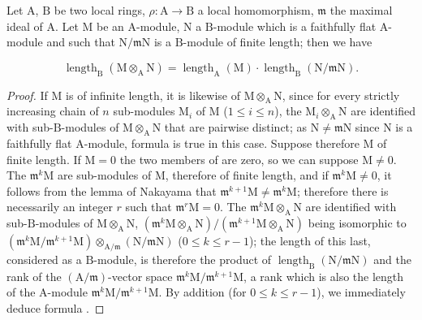 \begin{lemma}[2.5.5.2]
\label{IV.2.5.5.2}
Let $\mathrm{A}$, $\mathrm{B}$ be two local rings, $\rho:\mathrm{A}\to\mathrm{B}$ a local homomorphism,
$\mathfrak{m}$ the maximal ideal of $\mathrm{A}$. Let $\mathrm{M}$ be an $\mathrm{A}$-module, $\mathrm{N}$ a $\mathrm{B}$-module which is a faithfully flat $\mathrm{A}$-module
and such that $\mathrm{N}/\mathfrak{m}\mathrm{N}$ is a $\mathrm{B}$-module of finite length; then we have
\end{lemma}

\begin{env}[2.5.5.3]
\label{IV.2.5.5.3}
\[
  \operatorname{length}_{\mathrm{B}}(\mathrm{M}\otimes_{\mathrm{A}}\mathrm{N}) = \operatorname{length}_{\mathrm{A}}(\mathrm{M})\cdot\operatorname{length}_{\mathrm{B}}(\mathrm{N}/\mathfrak{m}\mathrm{N}).
\]
\end{env}

\begin{proof}
If $\mathrm{M}$ is of infinite length, it is likewise of $\mathrm{M}\otimes_{\mathrm{A}}\mathrm{N}$, since for every strictly
increasing chain of $n$ sub-modules $\mathrm{M}_i$ of $\mathrm{M}$ ($1\leq i\leq n$), the $\mathrm{M}_i\otimes_{\mathrm{A}}\mathrm{N}$ are identified
with sub-$\mathrm{B}$-modules of $\mathrm{M}\otimes_{\mathrm{A}}\mathrm{N}$ that are pairwise distinct; as $\mathrm{N}\neq\mathfrak{m}\mathrm{N}$ since $\mathrm{N}$
is a faithfully flat $\mathrm{A}$-module, formula  is true in this case. Suppose
therefore $\mathrm{M}$ of finite length. If $\mathrm{M}=0$ the two members of  are zero, so
we can suppose $\mathrm{M}\neq 0$. The $\mathfrak{m}^k\mathrm{M}$ are sub-modules of $\mathrm{M}$, therefore of finite
length, and if $\mathfrak{m}^k\mathrm{M}\neq 0$, it follows from the lemma of Nakayama that $\mathfrak{m}^{k+1}\mathrm{M}\neq\mathfrak{m}^k\mathrm{M}$; therefore
there is necessarily an integer $r$ such that $\mathfrak{m}^r\mathrm{M}=0$. The $\mathfrak{m}^k\mathrm{M}\otimes_{\mathrm{A}}\mathrm{N}$ are identified
with sub-$\mathrm{B}$-modules of $\mathrm{M}\otimes_{\mathrm{A}}\mathrm{N}$, $(\mathfrak{m}^k\mathrm{M}\otimes_{\mathrm{A}}\mathrm{N})/(\mathfrak{m}^{k+1}\mathrm{M}\otimes_{\mathrm{A}}\mathrm{N})$ being isomorphic to
$(\mathfrak{m}^k\mathrm{M}/\mathfrak{m}^{k+1}\mathrm{M})\otimes_{\mathrm{A}/\mathfrak{m}}(\mathrm{N}/\mathfrak{m}\mathrm{N})$ ($0\leq k\leq r-1$); the length
of this last, considered as a $\mathrm{B}$-module, is therefore the product of $\operatorname{length}_{\mathrm{B}}(\mathrm{N}/\mathfrak{m}\mathrm{N})$ and the
rank of the $(\mathrm{A}/\mathfrak{m})$-vector space $\mathfrak{m}^k\mathrm{M}/\mathfrak{m}^{k+1}\mathrm{M}$, a rank which is also the length of the
$\mathrm{A}$-module $\mathfrak{m}^k\mathrm{M}/\mathfrak{m}^{k+1}\mathrm{M}$. By addition (for $0\leq k\leq r-1$), we immediately deduce
formula .
\end{proof}

